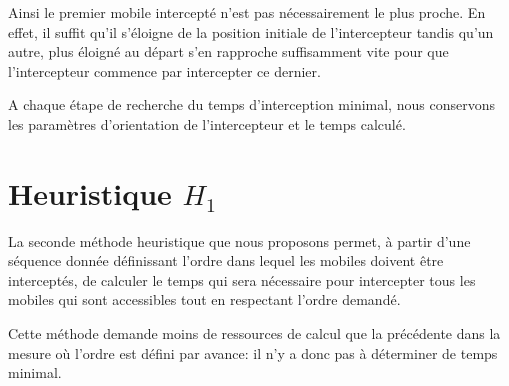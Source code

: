 	Ainsi le premier mobile intercepté n'est pas nécessairement le plus proche. En effet, il suffit qu'il s'éloigne de la position initiale de l'intercepteur tandis qu'un autre, plus éloigné au départ s'en rapproche suffisamment vite pour que l'intercepteur commence par intercepter ce dernier.

	A chaque étape de recherche du temps d'interception minimal, nous conservons les paramètres d'orientation de l'intercepteur et le temps calculé.

\section{Heuristique $H_1$}
	La seconde méthode heuristique que nous proposons permet, à partir d'une séquence donnée définissant l'ordre dans lequel les mobiles doivent être interceptés, de calculer le temps qui sera nécessaire pour intercepter tous les mobiles qui sont accessibles tout en respectant l'ordre demandé.

	Cette méthode demande moins de ressources de calcul que la précédente dans la mesure où l'ordre est défini par avance: il n'y a donc pas à déterminer de temps minimal.


